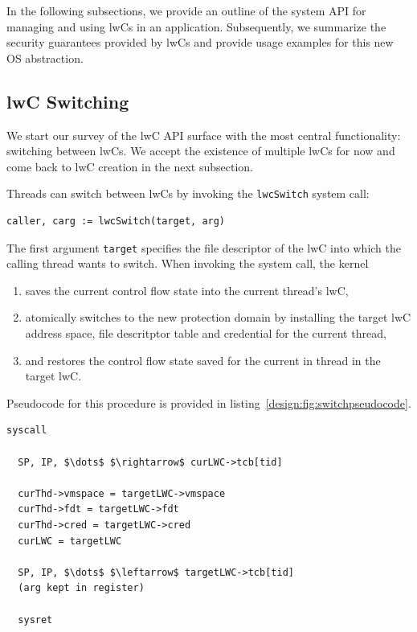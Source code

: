 \documentclass[10pt,twocolumn,letter]{article}
\begin{document}
In the following subsections, we provide an outline of the system API for managing and using lwCs in an application.
Subsequently, we summarize the security guarantees provided by lwCs and provide usage examples for this new OS abstraction. 

\subsection{lwC Switching}\label{design:switching}
We start our survey of the lwC API surface with the most central functionality: switching between lwCs.
We accept the existence of multiple lwCs for now and come back to lwC creation in the next subsection.

Threads can switch between lwCs by invoking the \lstinline{lwcSwitch} system call:

\begin{lstlisting}[float=h]
  caller, carg := lwcSwitch(target, arg) 
\end{lstlisting}

The first argument \lstinline{target} specifies the file descriptor of the lwC into which the calling thread wants to switch.
When invoking the system call, the kernel
\begin{enumerate}[label=(\alph*)]
\item saves the current control flow state into the current thread's lwC,
\item atomically switches to the new protection domain by installing the target lwC address space, file descritptor table and credential for the current thread,
\item and restores the control flow state saved for the current in thread in the target lwC.
\end{enumerate}
Pseudocode for this procedure is provided in listing~\ref{design:fig:switchpseudocode}.

\begin{lstlisting}[mathescape,label=design:fig:switchpseudocode,caption=Pseudo code for lwcSwitch.,frame=trbl]
  syscall
  
  SP, IP, $\dots$ $\rightarrow$ curLWC->tcb[tid]
  
  curThd->vmspace = targetLWC->vmspace
  curThd->fdt = targetLWC->fdt
  curThd->cred = targetLWC->cred
  curLWC = targetLWC
  
  SP, IP, $\dots$ $\leftarrow$ targetLWC->tcb[tid]
  (arg kept in register)
  
  sysret  
\end{lstlisting}
  
\end{document}
